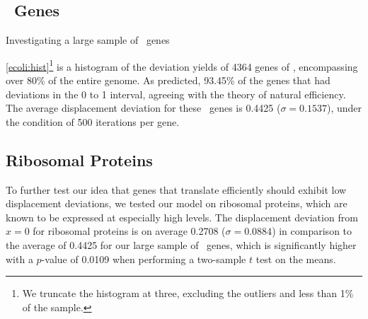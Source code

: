 \documentclass[12pt]{article}
\numberwithin{equation}{section}
\begin{document}
\subsection{\ecoli\ Genes}
\begin{cfigure}
  \caption{Investigating a large sample of \ecoli\ genes}
  \quad
\end{cfigure}

\autoref{ecoli:hist}\footnote{We truncate the histogram at three, excluding
  the outliers and less than 1\% of the sample.} is a histogram of the
deviation yields of 4364 genes of \ecoli, encompassing over 80\% of the entire
genome.  As predicted, 93.45\% of the genes that had deviations in the 0
to 1 interval, agreeing with the theory of natural efficiency.  The
average displacement deviation for these \ecoli\ genes is 0.4425 ($\sigma = 0.1537$), 
under the condition of 500 iterations per gene.

\subsection{Ribosomal Proteins}
\label{section:riboproteins}
To further test our idea that genes that translate efficiently should exhibit
low displacement deviations, we tested our model on ribosomal proteins, which
are known to be expressed at especially high levels.
The displacement deviation from $x=0$ for ribosomal proteins
is on average 0.2708 ($\sigma = 0.0884$) in comparison to the average of 0.4425 for our
large sample of \ecoli\ genes, which is significantly higher with a $p$-value of
0.0109 when performing a two-sample $t$ test on the means.
\end{document}
